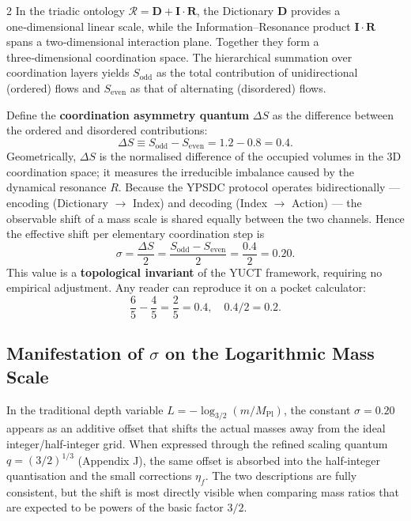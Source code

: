 \documentclass[11pt,a4paper]{article}
\begin{document}
\begin{multicols}{2}
In the triadic ontology \( \mathcal{R} = \mathbf{D} + \mathbf{I}\!\cdot\!\mathbf{R} \), the Dictionary \(\mathbf{D}\) provides a one‑dimensional linear scale, while the Information–Resonance product \(\mathbf{I}\!\cdot\!\mathbf{R}\) spans a two‑dimensional interaction plane. Together they form a three‑dimensional coordination space. The hierarchical summation over coordination layers yields \(S_{\mathrm{odd}}\) as the total contribution of unidirectional (ordered) flows and \(S_{\mathrm{even}}\) as that of alternating (disordered) flows.

Define the \textbf{coordination asymmetry quantum} \(\Delta S\) as the difference between the ordered and disordered contributions:
\begin{equation}
	\Delta S \equiv S_{\mathrm{odd}} - S_{\mathrm{even}} = 1.2 - 0.8 = 0.4.
	\label{eq:Deltas}
\end{equation}
Geometrically, \(\Delta S\) is the normalised difference of the occupied volumes in the 3D coordination space; it measures the irreducible imbalance caused by the dynamical resonance \(R\). Because the YPSDC protocol operates bidirectionally — encoding (Dictionary $\to$ Index) and decoding (Index $\to$ Action) — the observable shift of a mass scale is shared equally between the two channels. Hence the effective shift per elementary coordination step is
\begin{equation}
	\boxed{\sigma = \frac{\Delta S}{2} = \frac{S_{\mathrm{odd}} - S_{\mathrm{even}}}{2} = \frac{0.4}{2} = 0.20.}
	\label{eq:sigma}
\end{equation}
This value is a \textbf{topological invariant} of the YUCT framework, requiring no empirical adjustment. Any reader can reproduce it on a pocket calculator:
\[
\frac{6}{5} - \frac{4}{5} = \frac{2}{5} = 0.4,\quad 0.4 / 2 = 0.2.
\]

\subsection{Manifestation of \(\sigma\) on the Logarithmic Mass Scale}

In the traditional depth variable \(L = -\log_{3/2}(m/M_{\mathrm{Pl}})\), the constant \(\sigma = 0.20\) appears as an additive offset that shifts the actual masses away from the ideal integer/half‑integer grid. When expressed through the refined scaling quantum \(q = (3/2)^{1/3}\) (Appendix J), the same offset is absorbed into the half‑integer quantisation and the small corrections \(\eta_f\). The two descriptions are fully consistent, but the shift is most directly visible when comparing mass ratios that are expected to be powers of the basic factor \(3/2\).


\end{multicols}
\end{document}
